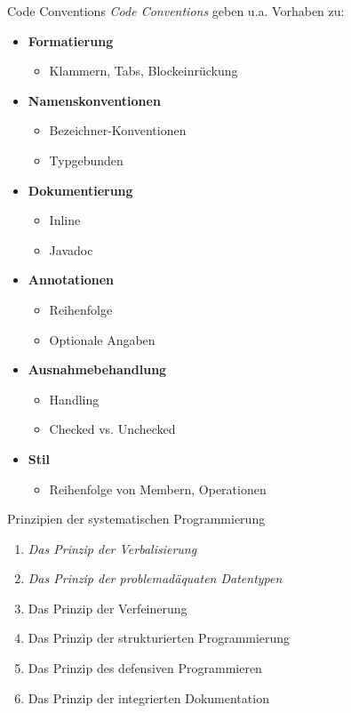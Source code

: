 \begin{defi}{Code Conventions}
    \emph{Code Conventions} geben u.a. Vorhaben zu:
    \begin{itemize}
        \item \textbf{Formatierung}
              \begin{itemize}
                  \item Klammern, Tabs, Blockeinrückung
              \end{itemize}
        \item \textbf{Namenskonventionen}
              \begin{itemize}
                  \item Bezeichner-Konventionen
                  \item Typgebunden
              \end{itemize}
        \item \textbf{Dokumentierung}
              \begin{itemize}
                  \item Inline
                  \item Javadoc
              \end{itemize}
        \item \textbf{Annotationen}
              \begin{itemize}
                  \item Reihenfolge
                  \item Optionale Angaben
              \end{itemize}
        \item \textbf{Ausnahmebehandlung}
              \begin{itemize}
                  \item Handling
                  \item Checked vs. Unchecked
              \end{itemize}
        \item \textbf{Stil}
              \begin{itemize}
                  \item Reihenfolge von Membern, Operationen
              \end{itemize}
    \end{itemize}
\end{defi}

\begin{defi}{Prinzipien der systematischen Programmierung}
    \begin{enumerate}
        \item \emph{Das Prinzip der Verbalisierung}
        \item \emph{Das Prinzip der problemadäquaten Datentypen}
        \item Das Prinzip der Verfeinerung
        \item Das Prinzip der strukturierten Programmierung
        \item Das Prinzip des defensiven Programmieren
        \item Das Prinzip der integrierten Dokumentation
    \end{enumerate}
\end{defi}

